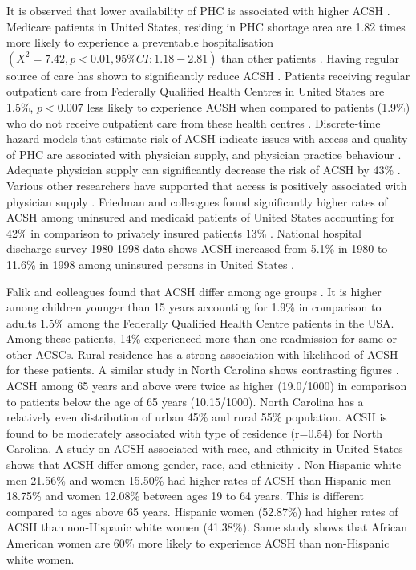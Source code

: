 It is observed that lower availability of PHC is associated with higher ACSH \cite{Parchman1999preventable}. Medicare patients in United States, residing in PHC shortage area are 1.82 times more likely to experience a preventable hospitalisation $(X^2=7.42, p<0.01, 95\%CI:1.18-2.81)$ than other patients \cite{Parchman1999preventable}. Having regular source of care has shown to significantly reduce ACSH \cite{Falik2001ambulatory, Gill1998the}. Patients receiving regular outpatient care from Federally Qualified Health Centres in United States are 1.5\%, $p<0.007$ less likely to experience ACSH when compared to patients (1.9\%) who do not receive outpatient care from these health centres \cite{Falik2001ambulatory}. Discrete-time hazard models that estimate risk of ACSH indicate issues with access and quality of PHC are associated with physician supply, and physician practice behaviour \cite{laditka2004physician}. Adequate physician supply can significantly decrease the risk of ACSH by 43\% \cite{laditka2004physician}. Various other researchers have supported that access is positively associated with physician supply \cite{basu2002primary,laditka2005more, parchman1994primary}. Friedman and colleagues found  significantly higher rates of ACSH among uninsured and medicaid patients of United States accounting for 42\% in comparison to privately insured patients 13\% \cite{friedman2001health}. National hospital discharge survey 1980-1998 data shows ACSH increased from 5.1\% in 1980 to 11.6\% in 1998 among uninsured persons in United States \cite{kozak2001trends}.

Falik and colleagues found that ACSH differ among age groups \cite{Falik2001ambulatory}. It is higher among children younger than 15 years accounting for 1.9\% in comparison to adults 1.5\% among the Federally Qualified Health Centre patients in the USA. Among these patients, 14\% experienced more than one readmission for same or other ACSCs. Rural residence has a strong association with likelihood of ACSH for these patients. A similar study in North Carolina shows contrasting figures \cite{ricketts2001hospitalization}. ACSH among 65 years and above were twice as higher (19.0/1000) in comparison to patients below the age of 65 years (10.15/1000). North Carolina has a relatively even distribution of urban 45\% and rural 55\% population. ACSH is found to be moderately associated with type of residence (r=0.54) for North Carolina. A study on ACSH associated with race, and ethnicity in United States shows that ACSH differ among gender, race, and ethnicity \cite{laditka2003hospital}. Non-Hispanic white men 21.56\% and women 15.50\% had higher rates of ACSH than Hispanic men 18.75\% and women 12.08\% between ages 19 to 64 years. This is different compared to ages above 65 years. Hispanic women (52.87\%) had higher rates of ACSH than non-Hispanic white women (41.38\%). Same study shows that African American women are 60\% more likely to experience ACSH than non-Hispanic white women. 

